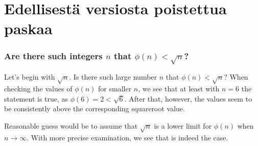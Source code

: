 \documentclass{article}
\theoremstyle{definition}
\begin{document}
\section{Edellisestä versiosta poistettua paskaa}

\subsubsection{Are there such integers $n$ that $\phi(n) < \sqrt{n}$?}

Let's begin with $\sqrt{n}$. Is there such large number $n$ that $\phi(n) < \sqrt{n}$? When checking the values of $\phi(n)$ for smaller $n$, we see that at least with $n=6$ the statement is true, as $\phi(6)=2<\sqrt{6}$. After that, however, the values seem to be consistently above the corresponding squareroot value.

Reasonable guess would be to assume that $\sqrt{n}$ is a lower limit for $\phi(n)$ when $n \rightarrow \infty$. With more precise examination, we see that is indeed the case.
\end{document}
